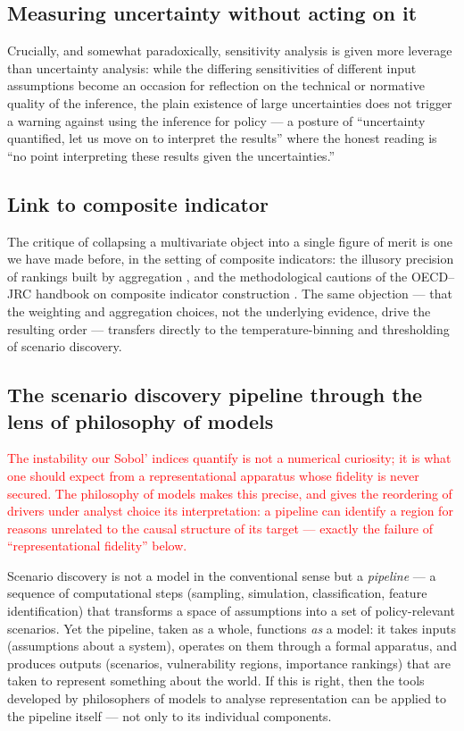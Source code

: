\documentclass[sn-basic]{sn-jnl}%
\begin{document}
\subsection{Measuring uncertainty without acting on it}
Crucially, and somewhat paradoxically, sensitivity analysis is given more leverage than uncertainty analysis: while the differing sensitivities of different input assumptions become an occasion for reflection on the technical or normative quality of the inference, the plain existence of large uncertainties does not trigger a warning against using the inference for policy --- a posture of ``uncertainty quantified, let us move on to interpret the results'' where the honest reading is ``no point interpreting these results given the uncertainties.''

\subsection{Link to composite indicator}
The critique of
collapsing a multivariate object into a single figure of merit is one we have
made before, in the setting of composite indicators: the illusory precision of
rankings built by aggregation \cite{paruolo_ratings_2013}, and the
methodological cautions of the OECD--JRC handbook on composite indicator
construction \cite{oecd_oecd-jrc_2008}. The same objection --- that the weighting
and aggregation choices, not the underlying evidence, drive the resulting
order --- transfers directly to the temperature-binning and thresholding of
scenario discovery.

\subsection{The scenario discovery pipeline through the lens of philosophy of models}

\textcolor{red}{The instability our Sobol' indices quantify is not a numerical curiosity; it is what one should expect from a representational apparatus whose fidelity is never secured. The philosophy of models makes this precise, and gives the reordering of drivers under analyst choice its interpretation: a pipeline can identify a region for reasons unrelated to the causal structure of its target --- exactly the failure of ``representational fidelity'' below.}

Scenario discovery is not a model in the conventional sense but a \textit{pipeline} --- a sequence of computational steps (sampling, simulation, classification, feature identification) that transforms a space of assumptions into a set of policy-relevant scenarios. Yet the pipeline, taken as a whole, functions \textit{as} a model: it takes inputs (assumptions about a system), operates on them through a formal apparatus, and produces outputs (scenarios, vulnerability regions, importance rankings) that are taken to represent something about the world. If this is right, then the tools developed by philosophers of models to analyse representation can be applied to the pipeline itself --- not only to its individual components.
\end{document}
